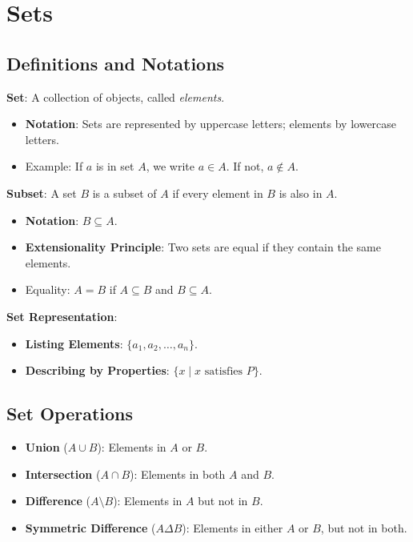 \section{Sets}

\subsection{Definitions and Notations}

\textbf{Set}: A collection of objects, called \textit{elements}.
\begin{itemize}
    \item \textbf{Notation}: Sets are represented by uppercase letters; elements by lowercase letters.
    \item Example: If $a$ is in set $A$, we write $a \in A$. If not, $a \notin A$.
\end{itemize}

\textbf{Subset}: A set $B$ is a subset of $A$ if every element in $B$ is also in $A$.
\begin{itemize}
    \item \textbf{Notation}: $B \subseteq A$.
    \item \textbf{Extensionality Principle}: Two sets are equal if they contain the same elements.
    \item Equality: $A = B$ if $A \subseteq B$ and $B \subseteq A$.
\end{itemize}

\textbf{Set Representation}:
\begin{itemize}
    \item \textbf{Listing Elements}: $\{ a_1, a_2, \ldots, a_n \}$.
    \item \textbf{Describing by Properties}: $\{ x \mid x \text{ satisfies } P \}$.
\end{itemize}

\subsection{Set Operations}

\begin{itemize}
    \item \textbf{Union} ($A \cup B$): Elements in $A$ or $B$.
    \item \textbf{Intersection} ($A \cap B$): Elements in both $A$ and $B$.
    \item \textbf{Difference} ($A \setminus B$): Elements in $A$ but not in $B$.
    \item \textbf{Symmetric Difference} ($A \Delta B$): Elements in either $A$ or $B$, but not in both.
\end{itemize}

